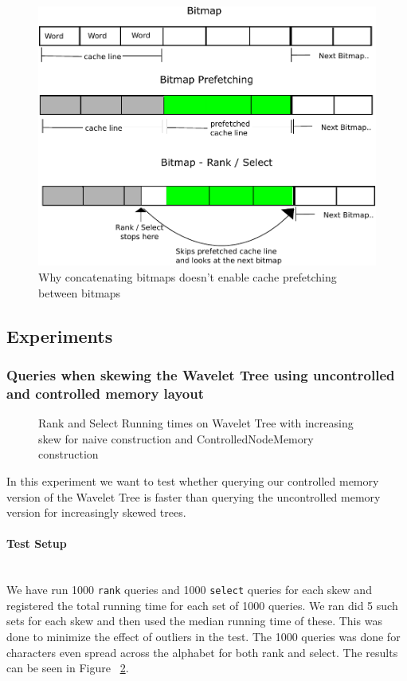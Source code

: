 \begin{figure}[h]
\caption{Why concatenating bitmaps doesn't enable cache prefetching between bitmaps}
\label{fig:QueryPrefetchFigure}
\includegraphics[width=\textwidth]{QueryPrefetchFigure.pdf}
\end{figure}



\subsection{Experiments}

\subsubsection{Queries when skewing the Wavelet Tree using uncontrolled and controlled memory layout}

\begin{figure}
\caption{Rank and Select Running times on Wavelet Tree with increasing skew for naive construction and ControlledNodeMemory construction}
\label{fig:NaiveRankSelectSkewRunningTime}

\end{figure}


In this experiment we want to test whether querying our controlled memory version of the Wavelet Tree is faster than querying the uncontrolled memory version for increasingly skewed trees. 

\paragraph{Test Setup}~\\
We have run 1000 \texttt{rank} queries and 1000 \texttt{select} queries for each skew and registered the total running time for each set of 1000 queries. 
We ran did 5 such sets for each skew and then used the median running time of these. 
This was done to minimize the effect of outliers in the test. The 1000 queries was done for characters even spread across the alphabet for both rank and select. The results can be seen in Figure ~\ref{fig:NaiveRankSelectSkewRunningTime}.

